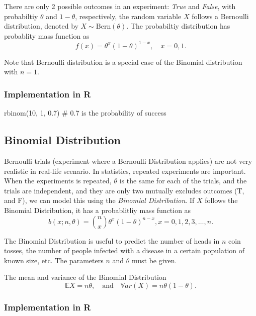 \documentclass[
  letterpaper,
  DIV=11,
  numbers=noendperiod]{scrreprt}
\newenvironment{Shaded}{\begin{snugshade}}{\end{snugshade}}
\newcommand{\CommentTok}[1]{\textcolor[rgb]{0.37,0.37,0.37}{#1}}
\newcommand{\DecValTok}[1]{\textcolor[rgb]{0.68,0.00,0.00}{#1}}
\newcommand{\FloatTok}[1]{\textcolor[rgb]{0.68,0.00,0.00}{#1}}
\newcommand{\FunctionTok}[1]{\textcolor[rgb]{0.28,0.35,0.67}{#1}}
\newcommand{\NormalTok}[1]{\textcolor[rgb]{0.00,0.23,0.31}{#1}}
\begin{document}
There are only 2 possible outcomes in an experiment: \emph{True} and
\emph{False}, with probabiltiy \(\theta\) and \(1-\theta\),
respectively, the random variable \(X\) follows a Bernoulli
distribution, denoted by \(X\sim \text{Bern}(\theta)\). The probabiltiy
distribution has probablity mass function as
\[f(x) = \theta^x (1-\theta)^{1-x},\quad x=0,1.\]

Note that Bernoulli distribution is a special case of the Binomial
distribution with \(n=1\).

\subsubsection{Implementation in R}\label{implementation-in-r-1}

\begin{Shaded}
\begin{Highlighting}[]
\FunctionTok{rbinom}\NormalTok{(}\DecValTok{10}\NormalTok{, }\DecValTok{1}\NormalTok{, }\FloatTok{0.7}\NormalTok{) }\CommentTok{\# 0.7 is the probability of success}
\end{Highlighting}
\end{Shaded}

\subsection{Binomial Distribution}\label{binomial-distribution}

Bernoulli trials (experiment where a Bernoulli Distribution applies) are
not very realistic in real-life scenario. In statistics, repeated
experiments are important. When the experiments is repeated, \(\theta\)
is the same for each of the trials, and the trials are independent, and
they are only two mutually excludes outcomes (T, and F), we can model
this using the \emph{Binomial Distribution}. If \(X\) follows the
Binomial Distribution, it has a probablitliy mass function as
\[b(x ; n, \theta)=\binom{n}{x} \theta^x(1-\theta)^{n-x}, x=0,1,2,3, \ldots, n.\]

The Binomial Distribution is useful to predict the number of heads in
\(n\) coin tosses, the number of people infected with a disease in a
certain population of known size, etc. The parameters \(n\) and
\(\theta\) must be given.

The mean and variance of the Binomial Distribution \[
\mathbb EX = n\theta,\quad \text{and}\quad \mathbb{V}ar(X) = n\theta(1-\theta).\]

\subsubsection{Implementation in R}\label{implementation-in-r-2}
\end{document}
